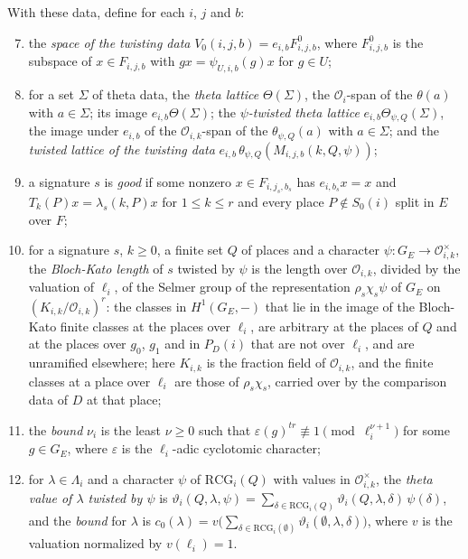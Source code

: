 \begin{definition}
With these data, define for each $i$, $j$ and $b$:
\begin{enumerate}\setcounter{enumi}{6}
\item the \emph{space of the twisting data} $V_0(i,j,b)=e_{i,b}F^0_{i,j,b}$,
  where $F^0_{i,j,b}$ is the subspace of $x\in F_{i,j,b}$ with
  $gx=\psi_{U,i,b}(g)x$ for $g\in U$;
\item for a set $\Sigma$ of theta data, the \emph{theta lattice}
  $\Theta(\Sigma)$, the $\mathcal O_i$-span of the $\theta(a)$ with
  $a\in\Sigma$; its image $e_{i,b}\Theta(\Sigma)$; the \emph{$\psi$-twisted
  theta lattice} $e_{i,b}\Theta_{\psi,Q}(\Sigma)$, the image under $e_{i,b}$ of
  the $\mathcal O_{i,k}$-span of the $\theta_{\psi,Q}(a)$ with $a\in\Sigma$; and
  the \emph{twisted lattice of the twisting data}
  $e_{i,b}\,\theta_{\psi,Q}(M_{i,j,b}(k,Q,\psi))$;
\item a signature $s$ is \emph{good} if some nonzero $x\in F_{i,j_s,b_s}$ has
  $e_{i,b_s}x=x$ and $T_k(P)x=\lambda_s(k,P)x$ for $1\leq k\leq r$ and every
  place $P\notin S_0(i)$ split in $E$ over $F$;
\item for a signature $s$, $k\geq0$, a finite set $Q$ of places and a character
  $\psi\colon G_E\to\mathcal O_{i,k}^\times$, the \emph{Bloch-Kato length} of
  $s$ twisted by $\psi$ is the length over $\mathcal O_{i,k}$, divided by the
  valuation of $\ell_i$, of the Selmer group of the representation
  $\rho_s\chi_s\psi$ of $G_E$ on $(K_{i,k}/\mathcal O_{i,k})^r$: the classes in
  $H^1(G_E,-)$ that lie in the image of the Bloch-Kato finite classes at the
  places over $\ell_i$, are arbitrary at the places of $Q$ and at the places
  over $g_0$, $g_1$ and in $P_D(i)$ that are not over $\ell_i$, and are
  unramified elsewhere; here $K_{i,k}$ is the fraction field of
  $\mathcal O_{i,k}$, and the finite classes at a place over $\ell_i$ are those
  of $\rho_s\chi_s$, carried over by the comparison data of $D$ at that place;
\item the \emph{bound} $\nu_i$ is the least $\nu\geq0$ such that
  $\varepsilon(g)^{tr}\not\equiv1\pmod{\ell_i^{\nu+1}}$ for some $g\in G_E$,
  where $\varepsilon$ is the $\ell_i$-adic cyclotomic character;
\item for $\lambda\in\Lambda_i$ and a character $\psi$ of $\mathrm{RCG}_i(Q)$
  with values in $\mathcal O_{i,k}^\times$, the \emph{theta value of $\lambda$
  twisted by $\psi$} is
  $\vartheta_i(Q,\lambda,\psi)=\sum_{\delta\in\mathrm{RCG}_i(Q)}\vartheta_i(Q,\lambda,\delta)\,\psi(\delta)$,
  and the \emph{bound} for $\lambda$ is
  $c_0(\lambda)=v\bigl(\sum_{\delta\in\mathrm{RCG}_i(\emptyset)}\vartheta_i(\emptyset,\lambda,\delta)\bigr)$,
  where $v$ is the valuation normalized by $v(\ell_i)=1$.
\end{enumerate}
\end{definition}
